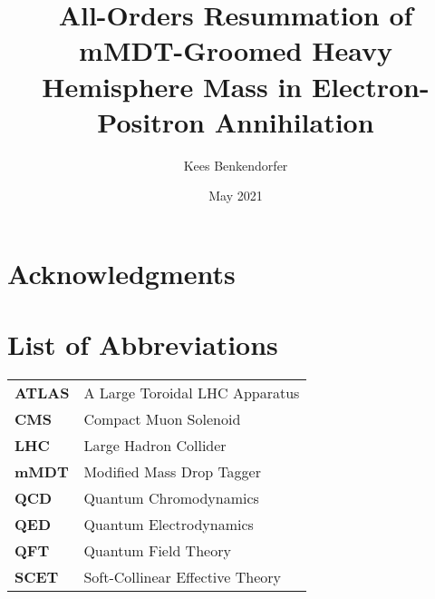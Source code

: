 \documentclass[12pt,twoside]{reedthesis}
\title{All-Orders Resummation of mMDT-Groomed Heavy Hemisphere Mass in Electron-Positron Annihilation}
\author{Kees Benkendorfer}
\date{May 2021}
\begin{document}
  \maketitle
  \frontmatter %
  \pagestyle{empty} %

    \chapter*{Acknowledgments}

    

	
	

    \chapter*{List of Abbreviations}

	\begin{table}[h]
	\centering %
	\begin{tabular}{ll}
		\textbf{ATLAS}	&  A Large Toroidal LHC Apparatus \\
		\textbf{CMS}	&  Compact Muon Solenoid \\
		\textbf{LHC}  	&  Large Hadron Collider \\
		\textbf{mMDT}  	&  Modified Mass Drop Tagger \\
		\textbf{QCD}  	&  Quantum Chromodynamics \\
		\textbf{QED}  	&  Quantum Electrodynamics \\
		\textbf{QFT}  	&  Quantum Field Theory \\
		\textbf{SCET}  	&  Soft-Collinear Effective Theory\\
	\end{tabular}
	\end{table}
	

    \tableofcontents
\end{document}

